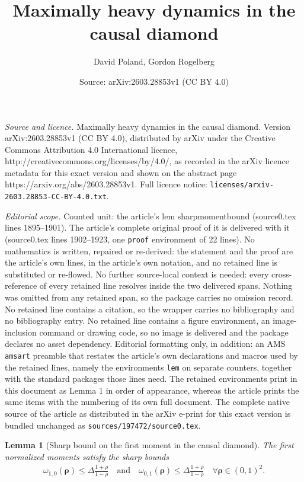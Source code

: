 \documentclass[10pt,a4paper]{amsart}
\title{Maximally heavy dynamics in the causal diamond}
\author{David Poland, Gordon Rogelberg}
\date{Source: arXiv:2603.28853v1 (CC BY 4.0)}
\newtheorem{lem}{Lemma}
\newcommand{\De}{\Delta}
\newcommand{\ba}{\begin{equation} \begin{aligned}}
\newcommand{\bs}[1]{\boldsymbol{#1}}
\newcommand{\ea}{\end{aligned} \end{equation}}
\newcommand{\rhob}{{\bar{\rho}}}
\begin{document}
\maketitle

\noindent\emph{Source and licence.} Maximally heavy dynamics in the causal diamond. Version arXiv:2603.28853v1 (CC BY 4.0), distributed by arXiv under the Creative Commons Attribution 4.0 International licence, http://creativecommons.org/licenses/by/4.0/, as recorded in the arXiv licence metadata for this exact version and shown on the abstract page https://arxiv.org/abs/2603.28853v1. Full licence notice: \texttt{licenses/arxiv-2603.28853-CC-BY-4.0.txt}.\par\smallskip

\noindent\textit{Editorial scope.} Counted unit: the article's lem sharpmomentbound (source0.tex lines 1895--1901). The article's complete original proof of it is delivered with it (source0.tex lines 1902--1923, one \texttt{proof} environment of 22 lines). No mathematics is written, repaired or re-derived: the statement and the proof are the article's own lines, in the article's own notation, and no retained line is substituted or re-flowed.  No further source-local context is needed: every cross-reference of every retained line resolves inside the two delivered spans.  Nothing was omitted from any retained span, so the package carries no omission record.  No retained line contains a citation, so the wrapper carries no bibliography and no bibliography entry.  No retained line contains a figure environment, an image-inclusion command or drawing code, so no image is delivered and the package declares no asset dependency.  Editorial formatting only, in addition: an AMS \texttt{amsart} preamble that restates the article's own declarations and macros used by the retained lines, namely the environments \texttt{lem} on separate counters, together with the standard packages those lines need.  The retained environments print in this document as Lemma 1 in order of appearance, whereas the article prints the same items with the numbering of its own full document.  The complete native source of the article as distributed in the arXiv e-print for this exact version is bundled unchanged as \texttt{sources/197472/source0.tex}.
\begin{lem}[Sharp bound on the first moment in the causal diamond]
\label{sharpmomentbound}
The first normalized moments satisfy the sharp bounds
\ba
\omega_{1,0}(\bs{\rho}) \leq \De \frac{1+\rho}{1-\rho} \quad \text{and} \quad \omega_{0,1}(\bs{\rho}) \leq \De \frac{1+\rhob}{1-\rhob} \quad \forall \bs{\rho} \in (0,1)^2.
\ea
\end{lem}
\end{document}
